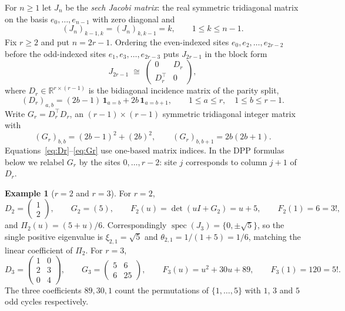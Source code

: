 \documentclass[11pt,a4paper]{article}
\theoremstyle{plain}
\theoremstyle{definition}
\newtheorem{example}[theorem]{Example}
\theoremstyle{remark}
\newcommand{\R}{\mathbb{R}}
\newcommand{\one}{\mathbf{1}}
\DeclareMathOperator{\spec}{spec}
\begin{document}
For $n\ge1$ let $J_n$ be the \emph{sech Jacobi matrix}: the real symmetric
tridiagonal matrix on the basis $e_0,\dots,e_{n-1}$ with zero diagonal and
\[
  (J_n)_{k-1,k}=(J_n)_{k,k-1}=k,\qquad 1\le k\le n-1 .
\]
Fix $r\ge2$ and put $n=2r-1$. Ordering the even-indexed sites
$e_0,e_2,\dots,e_{2r-2}$ before the odd-indexed sites
$e_1,e_3,\dots,e_{2r-3}$ puts $J_{2r-1}$ in the block form
\begin{equation}\label{eq:block}
  J_{2r-1}\;\cong\;
  \begin{pmatrix} 0 & D_r\\ D_r^{\!\top} & 0\end{pmatrix},
\end{equation}
where $D_r\in\R^{r\times(r-1)}$ is the bidiagonal incidence matrix of the parity
split,
\begin{equation}\label{eq:Dr}
  (D_r)_{a,b}=(2b-1)\,\one_{a=b}+2b\,\one_{a=b+1},
  \qquad 1\le a\le r,\quad 1\le b\le r-1 .
\end{equation}
Write $G_r=D_r^{\!\top}D_r$, an $(r-1)\times(r-1)$ symmetric tridiagonal integer
matrix with
\begin{equation}\label{eq:Gr}
  (G_r)_{b,b}=(2b-1)^2+(2b)^2,\qquad (G_r)_{b,b+1}=2b(2b+1).
\end{equation}
Equations~\eqref{eq:Dr}--\eqref{eq:Gr} use one-based matrix indices. In the DPP
formulas below we relabel $G_r$ by the sites $0,\dots,r-2$: site $j$ corresponds
to column $j+1$ of $D_r$.

\begin{example}[$r=2$ and $r=3$]\label{ex:small}
For $r=2$,
\[
  D_2=\begin{pmatrix}1\\2\end{pmatrix},\qquad G_2=(5),\qquad
  F_2(u)=\det(uI+G_2)=u+5,\qquad F_2(1)=6=3!,
\]
and $\Pi_2(u)=(5+u)/6$. Correspondingly
$\spec(J_3)=\{0,\pm\sqrt5\}$, so the single positive eigenvalue is
$\xi_{2,1}=\sqrt5$ and $\theta_{2,1}=1/(1+5)=1/6$, matching the linear
coefficient of $\Pi_2$. For $r=3$,
\[
  D_3=\begin{pmatrix}1&0\\2&3\\0&4\end{pmatrix},\qquad
  G_3=\begin{pmatrix}5&6\\6&25\end{pmatrix},\qquad
  F_3(u)=u^2+30u+89,\qquad F_3(1)=120=5! .
\]
The three coefficients $89,30,1$ count the permutations of $\{1,\dots,5\}$ with
$1$, $3$ and $5$ odd cycles respectively.
\end{example}
\end{document}
